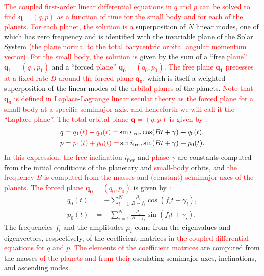 \documentclass[a4paper,fleqn]{cas-sc}
\begin{document}
\begin{linenumbers}
\textcolor{red}{
The coupled first-order linear differential equations in $q$ and $p$ can be solved to find $\mathbf{q}=(q,p)$ as a function of time for the small body and for each of the planets.
For each planet, the solution is a}
superposition of $N$ linear modes, one of which has zero frequency and is identified with the invariable plane of the Solar System \textcolor{red}{(the plane normal to the total barycentric orbital angular momentum vector). For the small body, the solution is}
given by the sum of a ``free \textcolor{red}{plane'' $\mathbf{q_1}=(q_1,p_1)$} and a ``forced \textcolor{red}{plane'' $\mathbf{q_0}=(q_0,p_0)$}.
\textcolor{red}{The free plane \textcolor{red}{$\mathbf{q_1}$} precesses at a fixed rate $B$ around the forced plane $\mathbf{q_0}$,} which is itself a weighted superposition of the linear modes of the \textcolor{red}{orbital planes} of the planets.
\textcolor{red}{
Note that $\mathbf{q_0}$ is defined in Laplace-Lagrange linear secular theory as the forced plane for a small body at a specific semimajor axis, and henceforth we will call it the ``Laplace plane''. 
}
\textcolor{red}{The total orbit\textcolor{red}{al} plane $\mathbf{q}=(q,p)$ is given by \citet[eq. 7.146]{md99}:}
\begin{align}
q &= \textcolor{red}{q_1(t)+q_0(t)=} \sin{i}_\mathrm{free}\cos(Bt+\gamma) + q_0(t), \label{e:q}\\
p &= \textcolor{red}{p_1(t)+p_0(t)=} \sin{i}_\mathrm{free}\sin(Bt+\gamma) + p_0(t). \label{e:p}
\end{align}
\textcolor{red}{In this expression, the free inclination }$i_\mathrm{free}$ and \textcolor{red}{phase} $\gamma$ are constants computed from the initial conditions of the planetary and \textcolor{red}{small-body} orbits, and \textcolor{red}{the frequency $B$ is computed from the masses and (constant) semimajor axes of the planets. The forced plane $\mathbf{q_0}=(q_0,p_0)$} is given by \citet[eq. 7.149-7.150]{md99}:
\begin{align}
q_0(t) &= -\sum_{i=1}^N \frac{\mu_i}{B-f_i}\cos\left(f_it+\gamma_i\right), \label{e:q0}\\
p_0(t) &= -\sum_{i=1}^N \frac{\mu_i}{B-f_i}\sin\left(f_it+\gamma_i\right). \label{e:p0}
\end{align}
The frequencies $f_i$ and the amplitudes $\mu_i$ come from the eigenvalues and eigenvectors, respectively, of the coefficient matrices \textcolor{red}{in the coupled differential equations for $q$ and $p$. 
The elements of the coefficient matrices} are computed from the masses \textcolor{red}{of the planets and from their} osculating semimajor axes, inclinations, and ascending nodes.

\end{linenumbers}
\end{document}
